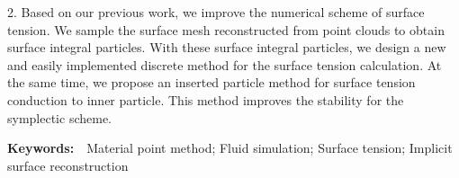     2. Based on our previous work, we improve the numerical scheme of surface tension. We sample the surface mesh reconstructed from point clouds to obtain surface integral particles. With these surface 
    integral particles, we design a new and easily implemented discrete method for the surface tension calculation. At the same time, we propose an inserted particle method for surface tension conduction to inner particle.
    This method improves the stability for the symplectic scheme.


\vspace{1em}

\textbf{Keywords:}~~Material point method; Fluid simulation; Surface tension; Implicit surface reconstruction
